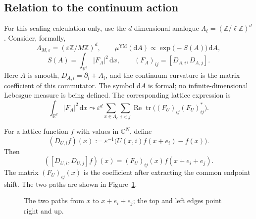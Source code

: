 \documentclass[10pt,reqno]{amsart}
\theoremstyle{definition}
\theoremstyle{remark}
\numberwithin{equation}{section}
\numberwithin{figure}{section}
\newcommand{\dd}{\mathrm d}
\newcommand{\YM}{\mathrm{YM}}
\newcommand{\R}{\mathbb R}
\newcommand{\C}{\mathbb C}
\newcommand{\Z}{\mathbb Z}
\newcommand{\e}{\varepsilon}
\DeclareMathOperator{\tr}{tr}
\begin{document}
\subsection{Relation to the continuum action}
For this scaling calculation only, use the $d$-dimensional analogue $\Lambda_\ell=(\Z/\ell\Z)^d$. Consider, formally,
\begin{equation}\label{eq:display-007}
\Lambda_{M,\e}=(\e\Z/M\Z)^d,
\qquad
\mu^{\YM}(\dd A)\propto\exp\bigl(-S(A)\bigr)\,\dd A,
\end{equation}
\begin{equation}\label{eq:display-008}
S(A)=\int_{\R^d}|F_A|^2\,\dd x,
\qquad (F_A)_{ij}=[D_{A,i},D_{A,j}].
\end{equation}
Here $A$ is smooth, $D_{A,i}=\partial_i+A_i$, and the continuum curvature is the matrix coefficient of this commutator. The symbol $\dd A$ is formal; no infinite-dimensional Lebesgue measure is being defined.
The corresponding lattice expression is
\begin{equation}\label{eq:display-009}
\int_{\R^d}|F_A|^2\,\dd x
\leadsto
\e^d\sum_{x\in\Lambda_\ell}\sum_{i<j}
\operatorname{Re}\tr\bigl((F_U)_{ij}(F_U)_{ij}^*\bigr).
\end{equation}

For a lattice function $f$ with values in $\C^N$, define
\begin{equation}\label{eq:display-010}
(D_{U,i}f)(x):=\e^{-1}\bigl(U(x,i)f(x+e_i)-f(x)\bigr).
\end{equation}
Then
\begin{equation}\label{eq:display-011}
([D_{U,i},D_{U,j}]f)(x)
=(F_U)_{ij}(x)f(x+e_i+e_j).
\end{equation}
The matrix $(F_U)_{ij}(x)$ is the coefficient after extracting the common endpoint shift. The two paths are shown in Figure~\ref{fig:curvature}.

\begin{figure}[htbp]
\centering
{}
\caption{The two paths from $x$ to $x+e_i+e_j$; the top and left edges point right and up.}
\label{fig:curvature}
\end{figure}
\end{document}
